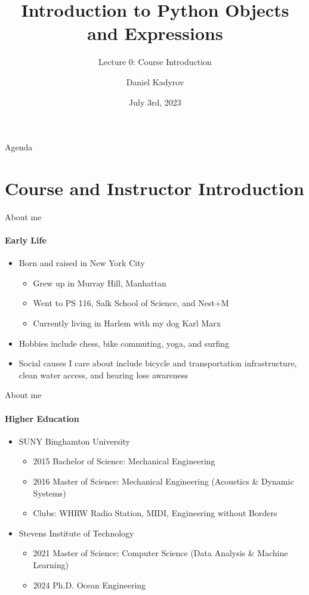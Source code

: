 \documentclass[
    aspectratio=169, 
    usepdftitle=false, 
    xcolor={dvipsnames},
    hyperref={
        colorlinks,
        linkcolor=black,
        urlcolor=blue}
    ]{beamer}
\title[Course Introduction]{Introduction to Python Objects and Expressions}
\subtitle{Lecture 0: Course Introduction}
\author{Daniel Kadyrov}
\date{July 3rd, 2023}
\begin{document}
\begin{frame}
\titlepage
\end{frame}

\begin{frame}{Agenda}
    \tableofcontents
\end{frame}

\section{Course and Instructor Introduction}
\begin{frame}{About me}
    \framesubtitle{Early Life}
    \begin{itemize}
    \item Born and raised in New York City
    \begin{itemize}
        \item Grew up in Murray Hill, Manhattan
        \item Went to PS 116, Salk School of Science, and Nest+M
        \item Currently living in Harlem with my dog Karl Marx
    \end{itemize}
    \item Hobbies include chess, bike commuting, yoga, and surfing
    \item Social causes I care about include bicycle and transportation infrastructure, clean water access, and hearing loss awareness
    \end{itemize}
\end{frame}

\begin{frame}{About me}
    \framesubtitle{Higher Education}
    \begin{itemize}
        \item SUNY Binghamton University
        \begin{itemize}
            \item 2015 Bachelor of Science: Mechanical Engineering
            \item 2016 Master of Science: Mechanical Engineering (Acoustics \& Dynamic Systems)
            \item Clubs: WHRW Radio Station, MIDI, Engineering without Borders
        \end{itemize}
        \item Stevens Institute of Technology
        \begin{itemize}
            \item 2021 Master of Science: Computer Science (Data Analysis \& Machine Learning)
            \item 2024 Ph.D. Ocean Engineering
        \end{itemize}
    \end{itemize}
\end{frame}
\end{document}
